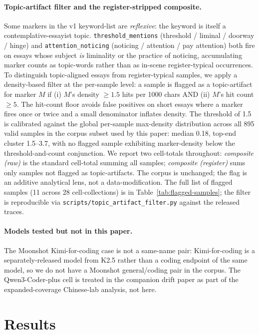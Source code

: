 \documentclass[11pt,a4paper]{article}
\begin{document}
\paragraph{Topic-artifact filter and the register-stripped composite.} Some markers in the v1 keyword-list are \emph{reflexive}: the keyword is itself a contemplative-essayist topic. \texttt{threshold\_mentions} (threshold / liminal / doorway / hinge) and \texttt{attention\allowbreak\_noticing} (noticing / attention / pay attention) both fire on essays whose subject \emph{is} liminality or the practice of noticing, accumulating marker counts as topic-words rather than as in-scene register-typical occurrences. To distinguish topic-aligned essays from register-typical samples, we apply a density-based filter at the per-sample level: a sample is flagged as a topic-artifact for marker $M$ if (i) $M$'s density $\ge 1.5$ hits per 1000 chars AND (ii) $M$'s hit count $\ge 5$. The hit-count floor avoids false positives on short essays where a marker fires once or twice and a small denominator inflates density. The threshold of 1.5 is calibrated against the global per-sample max-density distribution across all 895 valid samples in the corpus subset used by this paper: median 0.18, top-end cluster 1.5--3.7, with no flagged sample exhibiting marker-density below the threshold-and-count conjunction. We report two cell-totals throughout: \emph{composite (raw)} is the standard cell-total summing all samples; \emph{composite (register)} sums only samples not flagged as topic-artifacts. The corpus is unchanged; the flag is an additive analytical lens, not a data-modification. The full list of flagged samples (11 across 28 cell-collections) is in Table~\ref{tab:flagged-samples}; the filter is reproducible via \texttt{scripts/\allowbreak topic\_\allowbreak artifact\_\allowbreak filter.py} against the released traces.

\paragraph{Models tested but not in this paper.} The Moonshot Kimi-for-coding case is not a same-name pair: Kimi-for-coding is a separately-released model from K2.5 rather than a coding endpoint of the same model, so we do not have a Moonshot general/coding pair in the corpus. The Qwen3-Coder-plus cell is treated in the companion drift paper \citep{tenner2026drift} as part of the expanded-coverage Chinese-lab analysis, not here.

\section{Results}
\label{sec:results}
\end{document}
